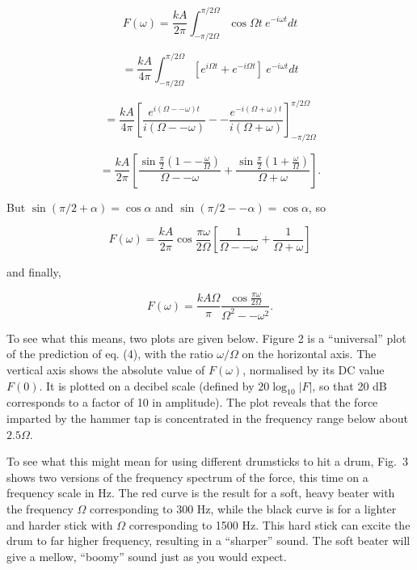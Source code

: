   $$F(\omega) = \dfrac{kA}{2 \pi} \int_{-\pi/2 \Omega}^{\pi/2 \Omega} \cos 
  \Omega t~e^{-i \omega t} dt \tag{3}$$ 

  $$ = \dfrac{kA}{4 \pi} \int_{-\pi/2 \Omega}^{\pi/2 \Omega} \left[ e^{i \Omega 
  t} + e^{-i \Omega t} \right]~e^{-i \omega t} dt $$ 

  $$= \dfrac{kA}{4 \pi} \left[ \dfrac{e^{i (\Omega -- \omega) t}}{i (\Omega -- 
  \omega)} -- \dfrac{e^{-i (\Omega + \omega) t}}{i (\Omega + \omega)} 
  \right]_{-\pi/2 \Omega}^{\pi/2 \Omega} $$ 

  $$= \dfrac{kA}{2 \pi} \left[ \dfrac{\sin \frac{\pi}{2} \left(1 -- 
  \frac{\omega}{\Omega} \right)}{\Omega -- \omega} + \dfrac{\sin \frac{\pi}{2} 
  \left(1 + \frac{\omega}{\Omega} \right)}{\Omega + \omega} \right].$$ 

  But $\sin (\pi/2 + \alpha) = \cos \alpha$ and $\sin(\pi/2 -- \alpha)= \cos 
  \alpha$, so 

  $$F(\omega) = \dfrac{kA}{2 \pi} \cos \dfrac{\pi \omega}{2 \Omega} \left[ 
  \dfrac{1}{\Omega -- \omega} + \dfrac{1}{\Omega + \omega} \right] $$ 

  and finally, 

  $$F(\omega) = \dfrac{kA \Omega}{\pi} \dfrac{\cos \frac{\pi \omega}{2 
  \Omega}}{\Omega^2 -- \omega^2}. \tag{4}$$ 

  To see what this means, two plots are given below. Figure 2 is a 
  ``universal'' plot of the prediction of eq. (4), with the ratio $\omega / 
  \Omega$ on the horizontal axis. The vertical axis shows the absolute value of 
  $F(\omega)$, normalised by its DC value $F(0)$. It is plotted on a decibel 
  scale (defined by $20\log_{10}|F|$, so that 20 dB corresponds to a factor of 
  10 in amplitude). The plot reveals that the force imparted by the hammer tap 
  is concentrated in the frequency range below about $2.5 \Omega$. 


  To see what this might mean for using different drumsticks to hit a drum, 
  Fig.\ 3 shows two versions of the frequency spectrum of the force, this time 
  on a frequency scale in Hz. The red curve is the result for a soft, heavy 
  beater with the frequency $\Omega$ corresponding to 300 Hz, while the black 
  curve is for a lighter and harder stick with $\Omega$ corresponding to 1500 
  Hz. This hard stick can excite the drum to far higher frequency, resulting in 
  a ``sharper'' sound. The soft beater will give a mellow, ``boomy'' sound just 
  as you would expect. 


